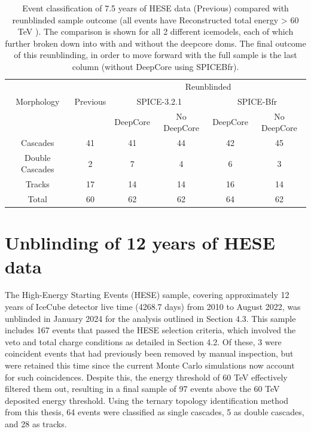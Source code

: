 \begin{table}[h]
    \caption[Event classification of 7.5 years of HESE data]{Event classification of 7.5 years of HESE data (Previous) compared with reunblinded sample outcome (all events have Reconstructed total energy > 60 TeV ). The comparison is shown for all 2 different icemodels, each of which further broken down into with and without the deepcore doms. The final outcome of this reunblinding, in order to move forward with the full sample is the last column (without DeepCore using SPICEBfr).}
    \raggedright
    \begin{tabular}{ c|c|c c |cc}
        \toprule
            & & \multicolumn{4}{c}{Reunblinded}\\
            
           Morphology&Previous & \multicolumn{2}{c|}{SPICE-3.2.1} & \multicolumn{2}{c}{SPICE-Bfr}\\
           
                     &   & DeepCore & No DeepCore & DeepCore & No DeepCore\\
                                
        \hline
        Cascades & 41 & 41 & 44 &42&45 \\
        Double Cascades & 2 & 7 &4&6& 3 \\
        Tracks& 17&14&14&16&14\\
        \hline
        Total & 60 & 62 &62&64&62\\
        \bottomrule
\end{tabular}
\end{table}


\section{Unblinding of 12 years of HESE data}
\label{sec:HESE12}
The High-Energy Starting Events (HESE) sample, covering approximately 12 years of IceCube detector live time (4268.7 days) from 2010 to August 2022, was unblinded in January 2024 for the analysis outlined in Section 4.3. This sample includes 167 events that passed the HESE selection criteria, which involved the veto and total charge conditions as detailed in Section 4.2. Of these, 3 were coincident events that had previously been removed by manual inspection, but were retained this time since the current Monte Carlo simulations now account for such coincidences. Despite this, the energy threshold of 60 TeV effectively filtered them out, resulting in a final sample of 97 events above the 60 TeV deposited energy threshold. Using the ternary topology identification method from this thesis, 64 events were classified as single cascades, 5 as double cascades, and 28 as tracks.



